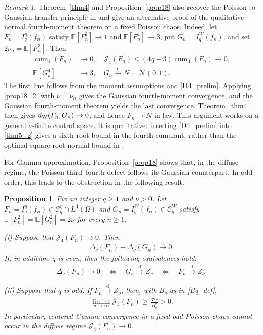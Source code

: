 \documentclass[letterpaper,11pt,reqno]{amsart}
\numberwithin{equation}{section}
\theoremstyle{plain}
\newtheorem{proposition}[theorem]{Proposition}
\theoremstyle{definition}
\theoremstyle{remark}
\newtheorem{remark}[theorem]{Remark}
\newcommand{\E}{\mathbb{E}}
\newcommand{\NN}{\mathcal{N}}
\newcommand{\cC}{\mathcal{C}}
\DeclareMathOperator{\cum}{cum}
\newcommand{\noi}{\noindent}
\newcommand{\Jfour}{\mathcal J_4}
\newcommand{\dW}{d_{\rm W}}
\newcommand{\Del}{\Delta}
\newcommand{\s}{\sigma}
\begin{document}
\begin{remark}\rm
Theorem~\ref{thm4} and Proposition~\ref{prop18} also recover the
Poisson-to-Gaussian transfer principle in
\cite[Proposition~1.5]{DVZ18} and give an alternative proof of the
qualitative normal fourth-moment theorem on a fixed Poisson chaos.
Indeed, let $F_n=I_q^\eta(f_n)$ satisfy
$\E[F_n^2]\to1$ and $\E[F_n^4]\to3$, put
$G_n=I_q^W(f_n)$, and set $2\nu_n=\E[F_n^2]$.  Then
\noi
\begin{align*}
 \cum_4(F_n)&\longrightarrow0,
 \quad
 \Jfour(F_n)\leq(4q-3)\cum_4(F_n)\longrightarrow0,\\
 \E[G_n^4]&\longrightarrow3,
 \quad
 G_n\xrightarrow{\mathrm d}N\sim\NN(0,1).
\end{align*}
The first line follows from the moment assumptions and
\eqref{D4_prelim}.  Applying \eqref{prop18_2} with $\nu=\nu_n$
gives the Gaussian fourth-moment convergence, and the Gaussian
fourth-moment theorem yields the last convergence.  Theorem~\ref{thm4}
then gives
$\dW(F_n,G_n)\to0$, and hence $F_n\to N$ in law.  This argument works
on a general $\s$-finite control space.  It is qualitative: inserting
\eqref{D4_prelim} into \eqref{thm5_2} gives a sixth-root bound in the
fourth cumulant, rather than the optimal square-root normal bound in
\cite[Theorem~1.2]{DVZ18}.

For Gamma approximation, Proposition~\ref{prop18} shows that, in the
diffuse regime, the Poisson third--fourth defect follows its Gaussian
counterpart.  In odd order, this leads to the obstruction in
the following result.

\end{remark}


\begin{proposition}\label{prop19}
Fix an integer $q\geq1$ and $\nu>0$.  Let
$F_n=I_q^\eta(f_n)\in\cC_q^\eta\cap L^4(\Omega)$ and
$G_n=I_q^W(f_n)\in\cC_q^W$ satisfy
$\E[F_n^2]=\E[G_n^2]=2\nu$ for every $n\geq1$.

\smallskip
{\rm(i)} Suppose that $\Jfour(F_n)\longrightarrow0$.  Then
\noi
\begin{align}
 \Del_\nu(F_n)-\Del_\nu(G_n)\longrightarrow0.
 \label{prop19_1}
\end{align}
If, in addition, $q$ is even, then the following equivalences hold:
\noi
\begin{align}
 \Del_\nu(F_n)\longrightarrow0
 \quad\Longleftrightarrow\quad
 G_n\xrightarrow{\mathrm d}Z_\nu
 \quad\Longleftrightarrow\quad
 F_n\xrightarrow{\mathrm d}Z_\nu.
 \label{prop19_2}
\end{align}

\smallskip
{\rm(ii)} Suppose that $q$ is odd.  If
$F_n\xrightarrow{\mathrm d}Z_\nu$, then, with $B_q$ as in
\eqref{Bq_def},
\noi
\begin{align}
 \liminf_{n\to\infty}\Jfour(F_n)
 \geq\frac{32\nu}{B_q^2}>0.
 \label{prop19_3}
\end{align}
In particular, centered Gamma convergence in a fixed odd Poisson chaos
cannot occur in the diffuse regime $\Jfour(F_n)\to0$.
\end{proposition}
\end{document}
